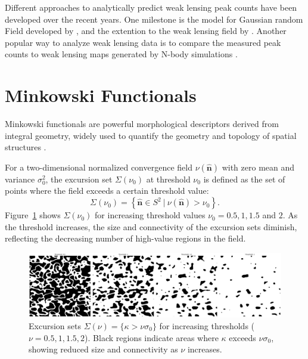 Different approaches to analytically predict weak lensing peak counts have been developed over the recent years. One milestone is the model for Gaussian random Field developed by \citet{1986ApJ...304...15B}, and the extention to the weak lensing field by \citet{2010A&A...519A..23M}. Another popular way to analyze weak lensing data is to compare the measured peak counts to weak lensing maps generated by N-body simulations \citep{2016MNRAS.463.3653K, 2018MNRAS.474..712M, 2021JCAP...01..028Z}.

\section{Minkowski Functionals}
\label{sec:minkowski_functionals}
Minkowski functionals are powerful morphological descriptors derived from integral geometry, widely used to quantify the geometry and topology of spatial structures \citep{2024arXiv241000401A}. 

For a two-dimensional normalized convergence field $\nu(\hat{\mathbf{n}})$ with zero mean and variance $\sigma_0^2$, the excursion set $\Sigma(\nu_0)$ at threshold $\nu_0$ is defined as the set of points where the field exceeds a certain threshold value:
\begin{equation}
    \Sigma(\nu_0) = \left\{ \hat{\mathbf{n}} \in S^2 \ \bigg| \ \nu(\hat{\mathbf{n}}) > \nu_0 \right\}.
\end{equation}
Figure~\ref{fig:excursion_sets} shows $\Sigma(\nu_0)$ for increasing threshold values $\nu_0 = 0.5, 1, 1.5$ and $2$. As the threshold increases, the size and connectivity of the excursion sets diminish, reflecting the decreasing number of high-value regions in the field.
\begin{figure}[ht]
    \centering
    \includegraphics[width=\textwidth]{figures/threshold_comparison.png}
    \caption{Excursion sets $\Sigma(\nu) = \{ \kappa > \nu \sigma_0 \}$ for increasing thresholds ($\nu = 0.5, 1, 1.5, 2$). Black regions indicate areas where $\kappa$ exceeds $\nu \sigma_0$, showing reduced size and connectivity as $\nu$ increases.}
    \label{fig:excursion_sets}
\end{figure}

